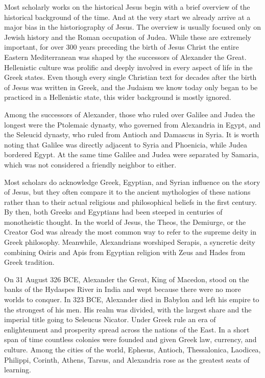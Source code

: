 Most scholarly works on the historical Jesus begin with a brief overview of the historical background of the time.
And at the very start we already arrive at a major bias in the historiography of Jesus.
The overview is usually focused only on Jewish history and the Roman occupation of Judea.
While these are extremely important, for over 300 years preceding the birth of Jesus Christ the entire Eastern Mediterranean was shaped by the successors of Alexander the Great.
Hellenistic culture was prolific and deeply involved in every aspect of life in the Greek states.
Even though every single Christian text for decades after the birth of Jesus was written in Greek, and the Judaism we know today only began to be practiced in a Hellenistic state, this wider background is mostly ignored.

Among the successors of Alexander, those who ruled over Galilee and Judea the longest were the Ptolemaic dynasty, who governed from Alexandria in Egypt, and the Seleucid dynasty, who ruled from Antioch and Damascus in Syria.
It is worth noting that Galilee was directly adjacent to Syria and Phoenicia, while Judea bordered Egypt.
At the same time Galilee and Judea were separated by Samaria, which was not considered a friendly neighbor to either.

Most scholars do acknowledge Greek, Egyptian, and Syrian influence on the story of Jesus, but they often compare it to the ancient mythologies of these nations rather than to their actual religious and philosophical beliefs in the first century.
By then, both Greeks and Egyptians had been steeped in centuries of monotheistic thought.
In the world of Jesus, the Theos, the Demiurge, or the Creator God was already the most common way to refer to the supreme deity in Greek philosophy.
Meanwhile, Alexandrians worshiped Serapis, a syncretic deity combining Osiris and Apis from Egyptian religion with Zeus and Hades from Greek tradition.

On 31 August 326 BCE, Alexander the Great, King of Macedon, stood on the banks of the Hydaspes River in India and wept because there were no more worlds to conquer.
In 323 BCE, Alexander died in Babylon and left his empire to the strongest of his men.
His realm was divided, with the largest share and the imperial title going to Seleucus Nicator.
Under Greek rule an era of enlightenment and prosperity spread across the nations of the East.
In a short span of time countless colonies were founded and given Greek law, currency, and culture.
Among the cities of the world, Ephesus, Antioch, Thessalonica, Laodicea, Philippi, Corinth, Athens, Tarsus, and Alexandria rose as the greatest seats of learning.

